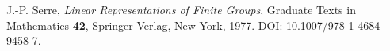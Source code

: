  J.-P. Serre, \emph{Linear Representations of Finite Groups},
Graduate Texts in Mathematics \textbf{42}, Springer-Verlag, New York, 1977.
DOI: 10.1007/978-1-4684-9458-7.

